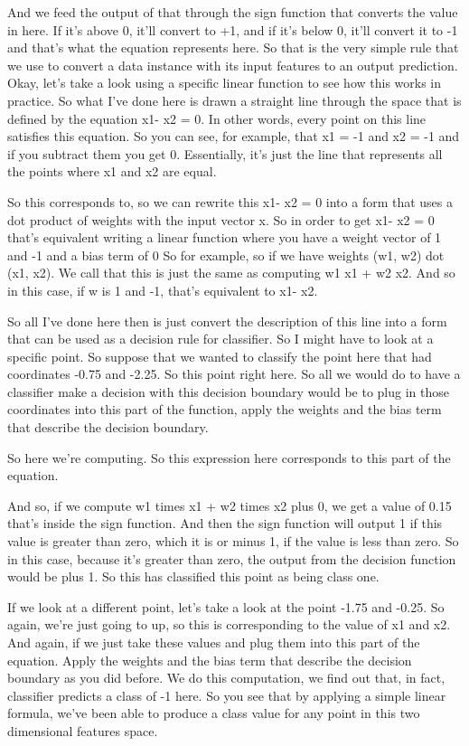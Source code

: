 \begin{multicols}{2}
And we feed the output of that through the sign function that converts the value in here. If it's above 0, it'll convert to +1, and if it's below 0, it'll convert it to -1 and that's what the equation represents here. So that is the very simple rule that we use to convert a data instance with its input features to an output prediction. Okay, let's take a look using a specific linear function to see how this works in practice. So what I've done here is drawn a straight line through the space that is defined by the equation x1- x2 = 0. In other words, every point on this line satisfies this equation. So you can see, for example, that x1 = -1 and x2 = -1 and if you subtract them you get 0. Essentially, it's just the line that represents all the points where x1 and x2 are equal. 

So this corresponds to, so we can rewrite this x1- x2 = 0 into a form that uses a dot product of weights with the input vector x. So in order to get x1- x2 = 0 that's equivalent writing a linear function where you have a weight vector of 1 and -1 and a bias term of 0 So for example, so if we have weights (w1, w2) dot (x1, x2). We call that this is just the same as computing w1 x1 + w2 x2. And so in this case, if w is 1 and -1, that's equivalent to x1- x2. 

So all I've done here then is just convert the description of this line into a form that can be used as a decision rule for classifier. So I might have to look at a specific point. So suppose that we wanted to classify the point here that had coordinates -0.75 and -2.25. So this point right here. So all we would do to have a classifier make a decision with this decision boundary would be to plug in those coordinates into this part of the function, apply the weights and the bias term that describe the decision boundary. 

So here we're computing. So this expression here corresponds to this part of the equation. 

And so, if we compute w1 times x1 + w2 times x2 plus 0, we get a value of 0.15 that's inside the sign function. And then the sign function will output 1 if this value is greater than zero, which it is or minus 1, if the value is less than zero. So in this case, because it's greater than zero, the output from the decision function would be plus 1. So this has classified this point as being class one. 

If we look at a different point, let's take a look at the point -1.75 and -0.25. So again, we're just going to up, so this is corresponding to the value of x1 and x2. And again, if we just take these values and plug them into this part of the equation. Apply the weights and the bias term that describe the decision boundary as you did before. We do this computation, we find out that, in fact, classifier predicts a class of -1 here. So you see that by applying a simple linear formula, we've been able to produce a class value for any point in this two dimensional features space. 


\end{multicols}
